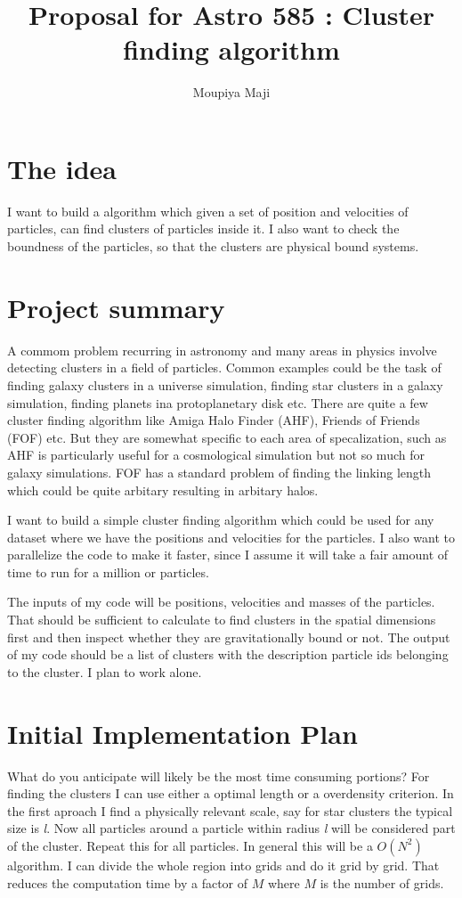 \documentclass[11pt]{article}
\title{Proposal for Astro 585 : Cluster finding algorithm}
\author{Moupiya Maji}
\begin{document}
\maketitle

\section{The idea}

I want to build a algorithm which given a set of position and velocities of particles, can find clusters of particles inside it. I also want to check the boundness of the particles, so that the clusters are physical bound systems.

\section{Project summary}

A commom problem recurring in astronomy and many areas in physics involve detecting clusters in a field of particles. Common examples could be the task of finding galaxy clusters in a universe simulation, finding star clusters in a galaxy simulation, finding planets ina  protoplanetary disk etc.
There are quite a few cluster finding algorithm like Amiga Halo Finder (AHF), Friends of Friends (FOF) etc. But they are somewhat specific to each area of specalization, such as AHF is particularly useful for a cosmological simulation but not so much for galaxy simulations. FOF has a standard problem of finding the linking length which could be quite arbitary resulting in arbitary halos.

I want to build a simple cluster finding algorithm which could be used for any dataset where  we have the positions and velocities for the particles. I also want to parallelize the code to make it faster, since I assume it will take a fair amount of time to run for a million or particles.

The inputs of my code will be positions, velocities and masses of the particles. That should be sufficient to calculate to find clusters in the spatial dimensions first and then inspect whether they are gravitationally bound or not. The output of my code should be a list of clusters with the description particle ids belonging to the cluster. I plan to work alone. 

\section{Initial Implementation Plan}
What do you anticipate will likely be the most time consuming portions?
For finding the clusters I can use either a optimal length or a overdensity criterion. In the first aproach I find a physically relevant scale, say for star clusters the typical size is \textit{l}. Now all particles around a particle within radius \textit{l} will be considered part of the cluster. Repeat this for all particles. In general this will be a $O(N^2)$ algorithm. I can divide the whole region into grids and do it grid by grid. That reduces the computation time by a factor of $M$ where $M$ is the number of grids.
\end{document}
